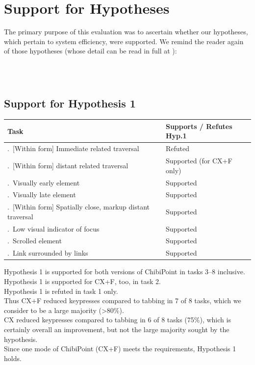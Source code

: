 \documentclass[11pt,openright,a4paper]{report}
\begin{document}
\section{Support for Hypotheses}
The primary purpose of this evaluation was to ascertain whether our hypotheses, which pertain to system efficiency, were supported. We remind the reader again of those hypotheses (whose detail can be read in full at ):

\textbf{\hypone}\\
\textbf{\hyptwo}\\

\subsection{Support for Hypothesis 1}
\newcommand{\tasktablenumber}{\stepcounter{tasktablecounter}\arabic{tasktablecounter}.~}
\begin{tabular}{l l}
\hline\hline %
Task & Supports / Refutes Hyp.1 \\ [0.5ex] %
\hline %
\tasktablenumber [Within form] Immediate related traversal & Refuted\\ \relax
\tasktablenumber [Within form] distant related traversal & Supported (for CX+F only)\\ \relax
\tasktablenumber Visually early element & Supported\\ \relax
\tasktablenumber Visually late element & Supported\\ \relax
\tasktablenumber [Within form] Spatially close, markup distant traversal & Supported\\ \relax
\tasktablenumber Low visual indicator of focus & Supported\\ \relax
\tasktablenumber Scrolled element & Supported\\ \relax
\tasktablenumber Link surrounded by links & Supported\\ [1ex] %
\hline %
\end{tabular}

Hypothesis 1 is supported for both versions of ChibiPoint in tasks 3--8 inclusive.\\
Hypothesis 1 is supported for CX+F, too, in task 2.\\
Hypothesis 1 is refuted in task 1 only.\\
Thus CX+F reduced keypresses compared to tabbing in 7 of 8 tasks, which we consider to be a large majority (>80\%).\\
CX reduced keypresses compared to tabbing in 6 of 8 tasks (75\%), which is certainly overall an improvement, but not the large majority sought by the hypothesis.\\
Since one mode of ChibiPoint (CX+F) meets the requirements, Hypothesis 1 holds.
\end{document}
